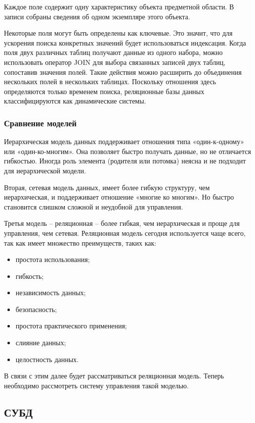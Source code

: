 \documentclass[12pt]{article}
\begin{document}
Каждое поле содержит одну характеристику объекта предметной области. В записи собраны сведения об одном экземпляре этого объекта.

Некоторые поля могут быть определены как ключевые. Это значит, что для ускорения поиска конкретных значений будет использоваться индексация. Когда поля двух различных таблиц получают данные из одного набора, можно использовать оператор JOIN для выбора связанных записей двух таблиц, сопоставив значения полей. Такие действия можно расширить до объединения нескольких полей в нескольких таблицах. Поскольку отношения здесь определяются только временем поиска, реляционные базы данных классифицируются как динамические системы. 

\subsubsection{Сравнение моделей}
\setcounter{subsubsection}{4}

Иерархическая модель данных поддерживает отношения типа «один-к-одному» или «один-ко-многим». Она позволяет быстро получать данные, но не отличается гибкостью. Иногда роль элемента (родителя или потомка) неясна и не подходит для иерархической модели.

Вторая, сетевая модель данных, имеет более гибкую структуру, чем иерархическая, и поддерживает отношение «многие ко многим». Но быстро становится слишком сложной и неудобной для управления.

Третья модель – реляционная – более гибкая, чем иерархическая и проще для управления, чем сетевая. Реляционная модель сегодня используется чаще всего, так как имеет множество преимуществ, таких как:

\begin{itemize}
	\item простота использования;
	\item гибкость;
	\item независимость данных;
	\item безопасность;
	\item простота практического применения;
	\item слияние данных;
	\item целостность данных.
\end{itemize}

В связи с этим далее будет рассматриваться реляционная модель. Теперь необходимо рассмотреть систему управления такой моделью.

\subsection{СУБД}%
\setcounter{subsection}{4}
\end{document}
